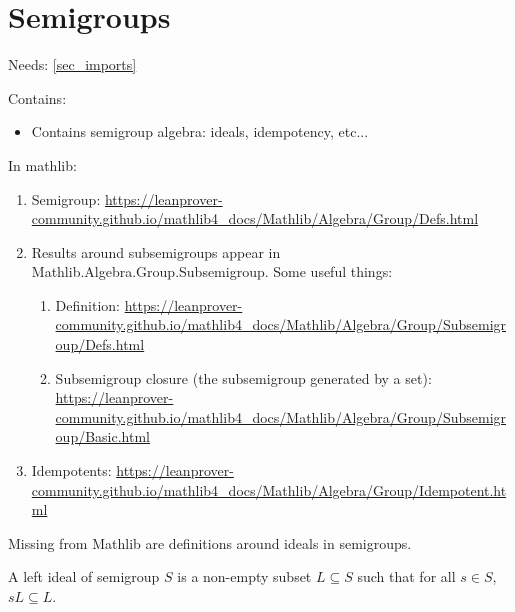 \section{Semigroups}
\label{sec_semigroups}

Needs: \cref{sec_imports}

Contains:
\begin{itemize}
    \item Contains semigroup algebra: ideals, idempotency, etc...
\end{itemize}

\begin{leanrmk}
    In mathlib:
    \begin{enumerate}
        \item Semigroup: \url{https://leanprover-community.github.io/mathlib4_docs/Mathlib/Algebra/Group/Defs.html}

        \item Results around subsemigroups appear in Mathlib.Algebra.Group.Subsemigroup.  Some useful things:
        \begin{enumerate}
            \item Definition: \url{https://leanprover-community.github.io/mathlib4_docs/Mathlib/Algebra/Group/Subsemigroup/Defs.html}

            \item Subsemigroup closure (the subsemigroup generated by a set): \url{https://leanprover-community.github.io/mathlib4_docs/Mathlib/Algebra/Group/Subsemigroup/Basic.html}
        \end{enumerate}

        \item Idempotents: \url{https://leanprover-community.github.io/mathlib4_docs/Mathlib/Algebra/Group/Idempotent.html}
    \end{enumerate}
\end{leanrmk}

\begin{leanrmk}
    Missing from Mathlib are definitions around ideals in semigroups.
\end{leanrmk}

\begin{definition}
\leanok{}
    A left ideal of semigroup $S$ is a non-empty subset $L \subseteq S$ such that for all $s \in S$, $s L \subseteq L$.
\end{definition}



